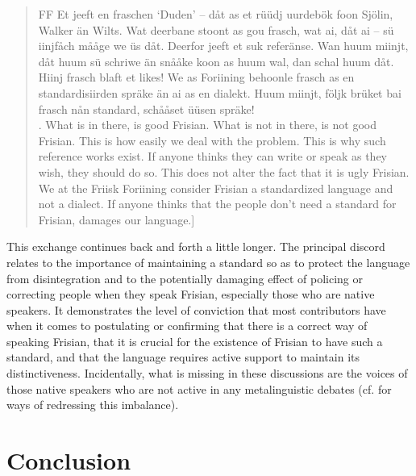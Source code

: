\documentclass[output=paper]{langsci/langscibook}
\begin{document}
\begin{quote}
FF Et jeeft en fraschen ‘Duden’ – dåt as et rüüdj uurdebök foon Sjölin, Walker än Wilts. Wat deerbane stoont as gou frasch, wat ai, dåt ai – sü iinjfåch mååge we üs dåt. Deerfor jeeft et suk referänse. Wan huum miinjt, dåt huum sü schriwe än snååke koon as huum wal, dan schal huum dåt. Hiinj frasch blaft et likes! We as Foriining behoonle frasch as en standardisiirden spräke än ai as en dialekt. Huum miinjt, följk brüket bai frasch nån standard, schååset üüsen spräke! \bigskip\\\relax
[There is a Frisian ‘Duden’ – namely the red dictionary by Sjölin, Walker and Wilts [1988]. What is in there, is good Frisian. What is not in there, is not good Frisian. This is how easily we deal with the problem. This is why such reference works exist. If anyone thinks they can write or speak as they wish, they should do so. This does not alter the fact that it is ugly Frisian. We at the Friisk Foriining consider Frisian a standardized language and not a dialect. If anyone thinks that the people don’t need a standard for Frisian, damages our language.]
\end{quote}

This exchange continues back and forth a little longer. The principal discord relates to the importance of maintaining a standard so as to protect the language from disintegration and to the potentially damaging effect of policing or correcting people when they speak Frisian, especially those who are native speakers. It demonstrates the level of conviction that most contributors have when it comes to postulating or confirming that there is a correct way of speaking Frisian, that it is crucial for the existence of Frisian to have such a standard, and that the language requires active support to maintain its distinctiveness. Incidentally, what is missing in these discussions are the voices of those native speakers who are not active in any metalinguistic debates (cf. \citealt{AdmiraalEtAl2019} for ways of redressing this imbalance). 

\section{Conclusion}
\label{sec:gregersen:6}
\end{document}
